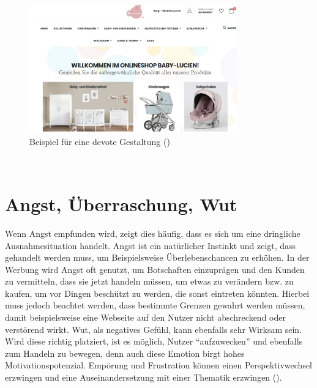 \documentclass[./dokumentation.tex]{subfiles}
\begin{document}
\begin{figure}[H]
    \centering
    \includegraphics[width=0.8\textwidth]{bilder/unt.png}
    \caption{Beispiel für eine devote Gestaltung (\cite{unt_bsp})}
    \label{fig8:unt}
\end{figure}\\
\section{Angst, Überraschung, Wut}
Wenn Angst empfunden wird, zeigt dies häufig, dass es sich um eine dringliche Ausnahmesituation handelt. Angst ist ein natürlicher Instinkt und zeigt, dass gehandelt werden muss, um Beispielsweise Überlebenschancen zu erhöhen. In der Werbung wird Angst oft genutzt, um Botschaften einzuprägen und den Kunden zu vermitteln, dass sie jetzt handeln müssen, um etwas zu verändern bzw. zu kaufen, um vor Dingen beschützt zu werden, die sonst eintreten könnten. Hierbei muss jedoch beachtet werden, dass bestimmte Grenzen gewahrt werden müssen, damit beispielsweise eine Webseite auf den Nutzer nicht abschreckend oder verstörend wirkt.
Wut, als negatives Gefühl, kann ebenfalls sehr Wirksam 
sein. Wird diese richtig platziert, ist es möglich, Nutzer “aufzuwecken” und ebenfalls zum Handeln zu bewegen, denn auch diese Emotion birgt hohes Motivationspotenzial. Empörung und Frustration können einen Perspektivwechsel erzwingen und eine Auseinandersetzung mit einer Thematik erzwingen  (\cite{Schubert2016}).
\end{document}
